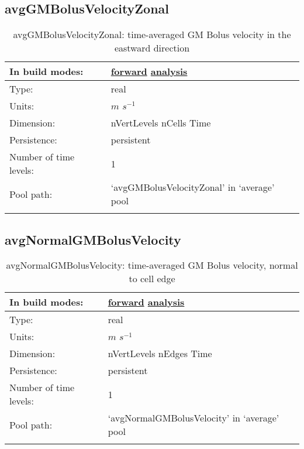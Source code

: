 \subsection[avgGMBolusVelocityZonal]{avgGMBolusVelocityZonal}
\label{subsec:var_sec_average_avgGMBolusVelocityZonal}
\begin{center}
\begin{longtable}{| p{2.0in} | p{4.0in} |}
        \hline 
        In build modes: & \hyperref[subsec:forward_var_tab_average]{forward} \hyperref[subsec:analysis_var_tab_average]{analysis} \\
        \hline 
        Type: & real \\
        \hline 
        Units: & $m$ $s^{-1}$ \\
        \hline 
        Dimension: & nVertLevels nCells Time \\
        \hline 
        Persistence: & persistent \\
        \hline 
        Number of time levels: & 1 \\
        \hline 
            Pool path: & `avgGMBolusVelocityZonal' in `average' pool \\
		 \hline 
    \caption{avgGMBolusVelocityZonal: time-averaged GM Bolus velocity in the eastward direction}
\end{longtable}
\end{center}
\subsection[avgNormalGMBolusVelocity]{avgNormalGMBolusVelocity}
\label{subsec:var_sec_average_avgNormalGMBolusVelocity}
\begin{center}
\begin{longtable}{| p{2.0in} | p{4.0in} |}
        \hline 
        In build modes: & \hyperref[subsec:forward_var_tab_average]{forward} \hyperref[subsec:analysis_var_tab_average]{analysis} \\
        \hline 
        Type: & real \\
        \hline 
        Units: & $m$ $s^{-1}$ \\
        \hline 
        Dimension: & nVertLevels nEdges Time \\
        \hline 
        Persistence: & persistent \\
        \hline 
        Number of time levels: & 1 \\
        \hline 
            Pool path: & `avgNormalGMBolusVelocity' in `average' pool \\
		 \hline 
    \caption{avgNormalGMBolusVelocity: time-averaged GM Bolus velocity, normal to cell edge}
\end{longtable}
\end{center}
